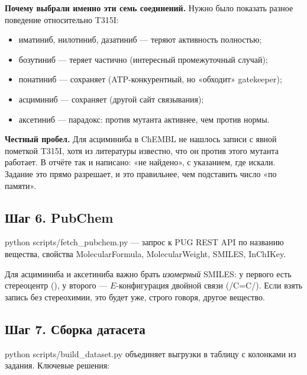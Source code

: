 \documentclass[11pt,a4paper]{article}
\newcommand{\code}[1]{{\ttfamily #1}}
\begin{document}
\textbf{Почему выбрали именно эти семь соединений.} Нужно было показать разное
поведение относительно T315I:
\begin{itemize}[leftmargin=*,topsep=2pt,itemsep=1pt]
\item иматиниб, нилотиниб, дазатиниб --- теряют активность полностью;
\item бозутиниб --- теряет частично (интересный промежуточный случай);
\item понатиниб --- сохраняет (ATP-конкурентный, но «обходит» gatekeeper);
\item асциминиб --- сохраняет (другой сайт связывания);
\item аксетиниб --- парадокс: против мутанта активнее, чем против нормы.
\end{itemize}

\textbf{Честный пробел.} Для асциминиба в ChEMBL не нашлось записи с явной
пометкой \code{T315I}, хотя из литературы известно, что он против этого мутанта
работает. В отчёте так и написано: «не найдено», с указанием, где искали. Задание
это прямо разрешает, и это правильнее, чем подставить число «по памяти».

\subsection{Шаг 6. PubChem}

\code{python scripts/fetch\_pubchem.py} --- запрос к PUG REST API по названию
вещества, свойства \code{MolecularFormula}, \code{MolecularWeight},
\code{SMILES}, \code{InChIKey}.

Для асциминиба и аксетиниба важно брать \emph{изомерный} SMILES: у первого есть
стереоцентр (\code{[C@@H]}), у второго --- $E$-конфигурация двойной связи
(\code{/C=C/}). Если взять запись без стереохимии, это будет уже, строго говоря,
другое вещество.

\subsection{Шаг 7. Сборка датасета}

\code{python scripts/build\_dataset.py} объединяет выгрузки в таблицу с колонками
из задания. Ключевые решения:
\end{document}
